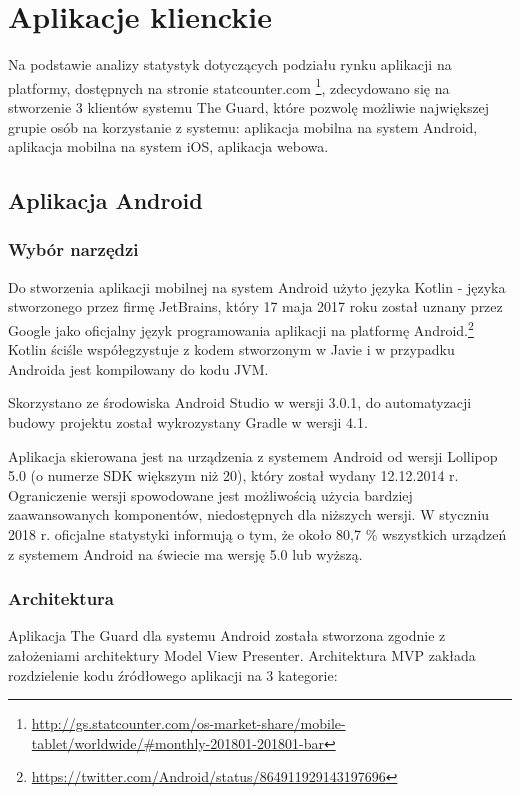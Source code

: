 \chapter{Aplikacje klienckie}

Na podstawie analizy statystyk dotyczących podziału rynku aplikacji na platformy, dostępnych na stronie statcounter.com \footnote{\url{http://gs.statcounter.com/os-market-share/mobile-tablet/worldwide/#monthly-201801-201801-bar}}, zdecydowano się na stworzenie 3 klientów systemu The Guard, które pozwolę możliwie największej grupie osób na korzystanie z systemu:
\newline
\newline
\textbullet \space aplikacja mobilna na system Android,\newline
\textbullet \space aplikacja mobilna na system iOS,\newline
\textbullet \space aplikacja webowa.

\section*{Aplikacja Android}
\subsection*{Wybór narzędzi}
Do stworzenia aplikacji mobilnej na system Android użyto języka Kotlin - języka stworzonego przez firmę JetBrains, który 17 maja 2017 roku został uznany przez Google jako oficjalny język programowania aplikacji na platformę Android.\footnote{\url{https://twitter.com/Android/status/864911929143197696}}
Kotlin ściśle współegzystuje z kodem stworzonym w Javie i w przypadku Androida jest kompilowany do kodu JVM.

Skorzystano ze środowiska Android Studio w wersji 3.0.1, do automatyzacji budowy projektu został wykrozystany Gradle w wersji 4.1.

Aplikacja skierowana jest na urządzenia z systemem Android od wersji Lollipop 5.0 (o numerze SDK większym niż 20), który został wydany 12.12.2014 r. Ograniczenie wersji spowodowane jest możliwością użycia bardziej zaawansowanych komponentów, niedostępnych dla niższych wersji. W styczniu 2018 r. oficjalne statystyki informują o tym, że około 80,7 \% wszystkich urządzeń z systemem Android na świecie ma wersję 5.0 lub wyższą.

\subsection*{Architektura}
Aplikacja The Guard dla systemu Android została stworzona zgodnie z założeniami architektury Model View Presenter. Architektura MVP zakłada rozdzielenie kodu źródłowego aplikacji na 3 kategorie:

